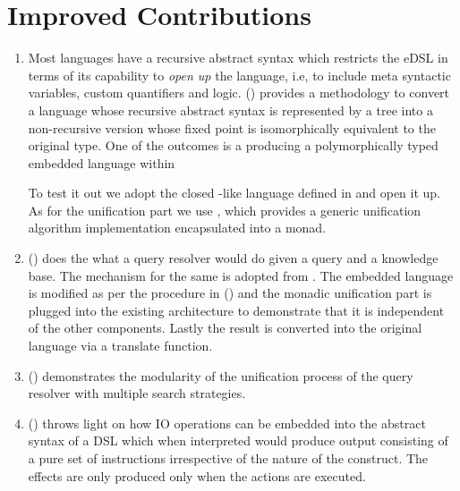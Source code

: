 \documentclass[thesis-solanki.tex]{subfiles}
\begin{document}
\section{Improved Contributions}
\begin{enumerate}
\item
  Most languages have a recursive abstract syntax which restricts the eDSL
  in terms of its capability to \textit{open up} the language{\large,} i.e{\large,} to include meta syntactic
  variables, custom quantifiers and logic.
  () provides a methodology to convert a language whose recursive abstract
  syntax is represented by a tree into a non-recursive version whose fixed point is isomorphically equivalent to
  the original type.
  One of the outcomes is a producing a polymorphically typed embedded language within 

  To test it out we adopt the closed -like language defined in \cite{prolog-lib} and open it up.
  As for the unification part we use \cite{unification-fd-lib}, which provides a generic unification algorithm
  implementation encapsulated into a monad.

\item
  () does the what a  query resolver would do given a
  query and a knowledge base.
  The mechanism for the same is adopted from \cite{prolog-lib}.
  The embedded language is modified as per the procedure in () and the
  monadic unification part is plugged into the existing architecture to demonstrate that it is independent of the
  other components.
  Lastly the result is converted into the original language via a translate function.

\item
  () demonstrates the modularity of the unification process of the query
  resolver with multiple search strategies.

\item
  () throws light on how IO operations can be embedded into the abstract
  syntax of a DSL which when interpreted would produce output consisting of a pure set of instructions irrespective
  of the nature of the construct.
  The effects are only produced only when the actions are executed.
\end{enumerate}
\end{document}
